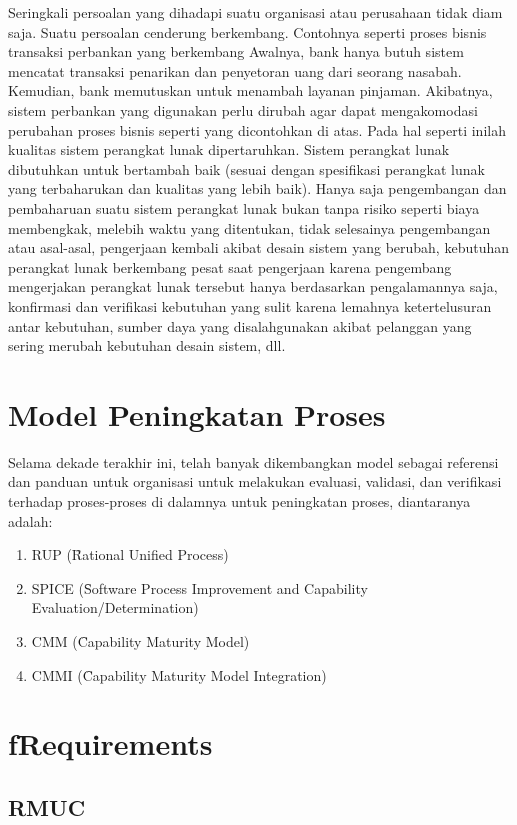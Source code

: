 Seringkali persoalan yang dihadapi suatu organisasi atau perusahaan tidak diam saja. Suatu persoalan cenderung berkembang. Contohnya seperti proses bisnis transaksi perbankan yang berkembang Awalnya, bank hanya butuh sistem mencatat transaksi penarikan dan penyetoran uang dari seorang nasabah. Kemudian, bank memutuskan untuk menambah layanan pinjaman. Akibatnya, sistem perbankan yang digunakan perlu dirubah agar dapat mengakomodasi perubahan proses bisnis seperti yang dicontohkan di atas. Pada hal seperti inilah kualitas sistem perangkat lunak dipertaruhkan. Sistem perangkat lunak dibutuhkan untuk bertambah baik (sesuai dengan spesifikasi perangkat lunak yang terbaharukan dan kualitas yang lebih baik). Hanya saja pengembangan dan pembaharuan suatu sistem perangkat lunak bukan tanpa risiko seperti biaya membengkak, melebih waktu yang ditentukan,  tidak selesainya pengembangan atau asal-asal, pengerjaan kembali akibat desain sistem yang berubah, kebutuhan perangkat lunak berkembang pesat saat pengerjaan karena pengembang mengerjakan perangkat lunak tersebut hanya berdasarkan pengalamannya saja, konfirmasi dan verifikasi kebutuhan yang sulit karena lemahnya ketertelusuran antar kebutuhan, sumber daya yang disalahgunakan akibat pelanggan yang sering merubah kebutuhan desain sistem, dll.
\section{Model Peningkatan Proses}
Selama dekade terakhir ini, telah banyak dikembangkan model sebagai referensi dan panduan untuk organisasi untuk melakukan evaluasi, validasi, dan verifikasi terhadap proses-proses di dalamnya untuk peningkatan proses, diantaranya adalah:
\begin{enumerate}
	\item RUP (\f{Rational Unified Process})
	\item SPICE (\f{Software Process Improvement and Capability Evaluation/Determination})
	\item CMM (\f{Capability Maturity Model})
	\item CMMI (\f{Capability Maturity Model Integration})
\end{enumerate}


\section{f{Requirements}}

\subsection{RMUC}

